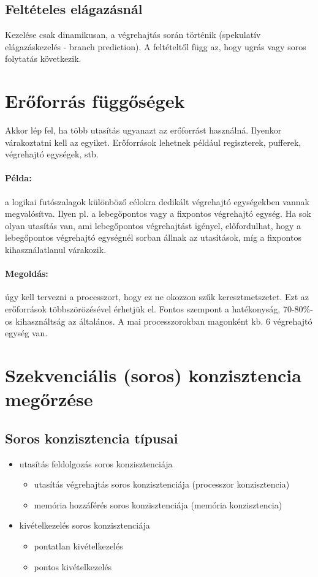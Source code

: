 \subsection{Feltételes elágazásnál}
Kezelése csak dinamikusan, a végrehajtás során történik (spekulatív elágazáskezelés - branch prediction).
A feltételtől függ az, hogy ugrás vagy soros folytatás következik.

\section{Erőforrás függőségek}
Akkor lép fel, ha több utasítás ugyanazt az erőforrást használná.
Ilyenkor várakoztatni kell az egyiket.
Erőforrások lehetnek például regiszterek, pufferek, végrehajtó egységek, stb.
\paragraph{Példa:} a logikai futószalagok különböző célokra dedikált végrehajtó egységekben vannak megvalósítva.
Ilyen pl. a lebegőpontos vagy a fixpontos végrehajtó egység.
Ha sok olyan utasítás van, ami lebegőpontos végrehajtást igényel, előfordulhat, hogy a lebegőpontos végrehajtó egységnél sorban állnak az utasítások, míg a fixpontos kihasználatlanul várakozik.
\paragraph{Megoldás:} úgy kell tervezni a processzort, hogy ez ne okozzon szűk keresztmetszetet. Ezt az erőforrások többszörözésével érhetjük el.
Fontos szempont a hatékonyság, 70-80\%-os kihasználtság az általános.
A mai processzorokban magonként kb. 6 végrehajtó egység van.

\section{Szekvenciális (soros) konzisztencia megőrzése}
\subsection{Soros konzisztencia típusai}
\begin{itemize}
    \item utasítás feldolgozás soros konzisztenciája
          \begin{itemize}
              \item utasítás végrehajtás soros konzisztenciája (processzor konzisztencia)
              \item memória hozzáférés soros konzisztenciája (memória konzisztencia)
          \end{itemize}
    \item kivételkezelés soros konzisztenciája
          \begin{itemize}
              \item pontatlan kivételkezelés
              \item pontos kivételkezelés
          \end{itemize}
\end{itemize}

